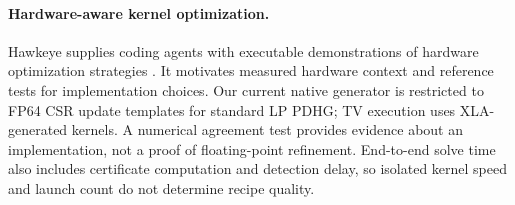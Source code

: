 \paragraph{Hardware-aware kernel optimization.}
Hawkeye supplies coding agents with executable demonstrations of hardware
optimization strategies \citep{Hawkeye2026}. It motivates measured hardware
context and reference tests for implementation choices. Our current native
generator is restricted to FP64 CSR update templates for standard LP PDHG;
TV execution uses XLA-generated kernels. A numerical agreement test provides
evidence about an implementation, not a proof of floating-point refinement.
End-to-end solve time also includes certificate computation and detection
delay, so isolated kernel speed and launch count do not determine recipe
quality.
